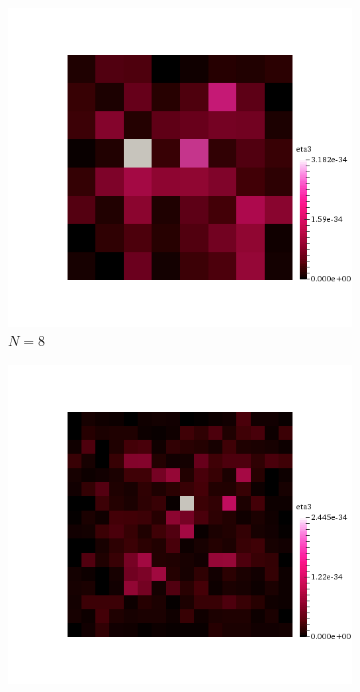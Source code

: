 \begin{figure}[h!]
  \centering
  \begin{subfigure}[b]{0.24\textwidth}
    \includegraphics[width=\textwidth,height=\textheight,keepaspectratio,height=\textheight,keepaspectratio]{figures/1_mpet/space/eta3_8.png}
    \caption{$N=8$}
  \end{subfigure}
  \begin{subfigure}[b]{0.24\textwidth}
    \includegraphics[width=\textwidth,height=\textheight,keepaspectratio,height=\textheight,keepaspectratio]{figures/1_mpet/space/eta3_16.png}

\end{subfigure}
\end{figure}
